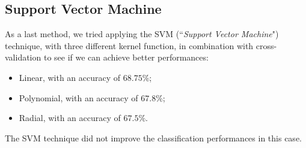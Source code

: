 \subsection{Support Vector Machine}

As a last method, we tried applying the SVM (``\textit{Support Vector Machine}") technique, with three different kernel function, in combination with cross-validation to see if we can achieve better performances:
\begin{itemize}
	\item Linear, with an accuracy of $68.75\%$;
	\item Polynomial, with an accuracy of $67.8\%$;
	\item Radial, with an accuracy of $67.5\%$.
\end{itemize} 

The SVM technique did not improve the classification performances in this case.